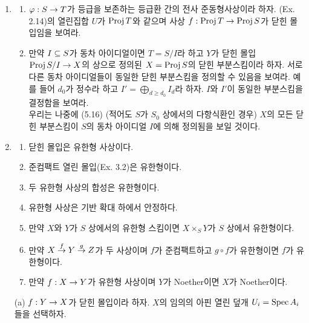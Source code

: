 \begin{enumerate}[label=\tb{3.\arabic*.},itemindent=0mm,itemsep=4mm]
	(c) $X=\Spec A$가 아핀 스킴인 경우 (b)에 의해 $Y=\Spec A/\mf a,Y'=\Spec A/\mf a'$으로 표현 가능하다.
	축약 유도 부분스킴 구조의 정의에 의해 $\mf a\pseq\mf a'$이다.
	닫힌 몰입 $Y\ra X$는 전사 준동형사상 $A\ra A/\mf a,f\mt f+\mf a$에 대응하며
	이는 자명하게 $A\ra A/\mf a',f\mt f+\mf a'$과 $A/\mf a'\ra A/\mf a,f+\mf a'\mt f+\mf a$로 분해된다.\\
	일반적인 경우에는 이러한 사상들을 이어붙이면 된다.
	$X$의 아핀 열린 덮개를 고정하고 두 덮개 원소의 교집합에서 Nike's trick을 사용하여 분해된 사상이 교집합 상에서 일치함을 보일 수 있다.\\
	(d)
	\item {}
	\begin{enumerate}[label=(\alph*)]
	\item $\varphi:S\rightarrow T$가 등급을 보존하는 등급환 간의 전사 준동형사상이라 하자.
	(Ex. 2.14)의 열린집합 $U$가 $\operatorname{Proj} T$와 같으며 사상 $f:\operatorname{Proj} T\rightarrow\operatorname{Proj} S$가 닫힌 몰입임을 보여라.
	\item 만약 $I\subseteq S$가 동차 아이디얼이면 $T=S/I$라 하고 $Y$가 닫힌 몰입 $\operatorname{Proj} S/I\rightarrow X$의 상으로 정의된
	$X=\operatorname{Proj} S$의 닫힌 부분스킴이라 하자. 서로 다른 동차 아이디얼들이 동일한 닫힌 부분스킴을 정의할 수 있음을 보여라.
	예를 들어 $d_0$가 정수라 하고 $I'=\bigoplus_{d\ge d_0}I_d$라 하자. $I$와 $I'$이 동일한 부분스킴을 결정함을 보여라.\\
	우리는 나중에 (5.16) (적어도 $S$가 $S_0$ 상에서의 다항식환인 경우)
	$X$의 모든 닫힌 부분스킴이 $S$의 동차 아이디얼 $I$에 의해 정의됨을 보일 것이다.
	\end{enumerate}
	\sol
	\item {}
	\begin{enumerate}[label=(\alph*)]
	\item 닫힌 몰입은 유한형 사상이다.
	\item 준컴팩트 열린 몰입(Ex. 3.2)은 유한형이다.
	\item 두 유한형 사상의 합성은 유한형이다.
	\item 유한형 사상은 기반 확대 하에서 안정하다.
	\item 만약 $X$와 $Y$가 $S$ 상에서의 유한형 스킴이면 $X\times_SY$가 $S$ 상에서 유한형이다.
	\item 만약 $X\stackrel{f}{\rightarrow} Y\stackrel{g}{\rightarrow} Z$가 두 사상이며 $f$가 준컴팩트하고 $g\circ f$가 유한형이면 $f$가 유한형이다.
	\item 만약 $f:X\rightarrow Y$가 유한형 사상이며 $Y$가 Noether이면 $X$가 Noether이다.
	\end{enumerate}
	\sol (a) $f:Y\rightarrow X$가 닫힌 몰입이라 하자. $X$의 임의의 아핀 열린 덮개 $U_i=\operatorname{Spec} A_i$들을 선택하자.

\end{enumerate}
